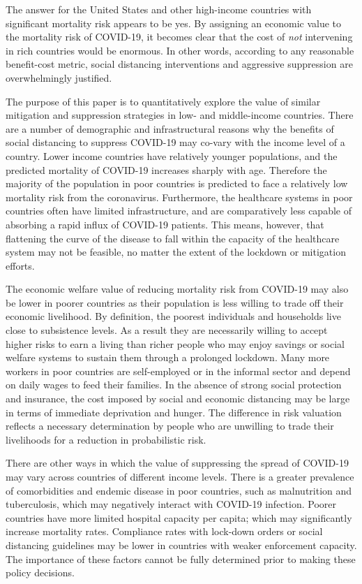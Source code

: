\documentclass[11pt]{article}
\begin{document}
The answer for the United States and other high-income countries with significant mortality risk appears to be yes. By assigning an economic value to the mortality risk of COVID-19, it becomes clear that the cost of \textit{not} intervening in rich countries would be enormous. In other words, according to any reasonable benefit-cost metric, social distancing interventions and aggressive suppression are overwhelmingly justified.

The purpose of this paper is to quantitatively explore the value of similar mitigation and suppression strategies in low- and middle-income countries. There are a number of demographic and infrastructural reasons why the benefits of social distancing to suppress COVID-19 may co-vary with the income level of a country. Lower income countries have relatively younger populations, and the predicted mortality of COVID-19 increases sharply with age. Therefore the majority of the population in poor countries is predicted to face a relatively low mortality risk from the coronavirus. Furthermore, the healthcare systems in poor countries often have limited infrastructure, and are comparatively less capable of absorbing a rapid influx of COVID-19 patients. This means, however, that flattening the curve of the disease to fall within the capacity of the healthcare system may not be feasible, no matter the extent of the lockdown or mitigation efforts. 

The economic welfare value of reducing mortality risk from COVID-19 may also be lower in poorer countries as their population is less willing to trade off their economic livelihood. By definition, the poorest individuals and households live close to subsistence levels. As a result they are necessarily willing to accept higher risks to earn a living than richer people who may enjoy savings or social welfare systems to sustain them through a prolonged lockdown. Many more workers in poor countries are self-employed or in the informal sector and depend on daily wages to feed their families. In the absence of strong social protection and insurance, the cost imposed by social and economic distancing may be large in terms of immediate deprivation and hunger. The difference in risk valuation reflects a necessary determination by people who are unwilling to trade their livelihoods for a reduction in probabilistic risk.

There are other ways in which the value of suppressing the spread of COVID-19 may vary across countries of different income levels. There is a greater prevalence of comorbidities and endemic disease in poor countries, such as malnutrition and tuberculosis, which may negatively interact with COVID-19 infection. Poorer countries have more limited hospital capacity per capita; which may significantly increase mortality rates. Compliance rates with lock-down orders or social distancing guidelines may be lower in countries with weaker enforcement capacity. The importance of these factors cannot be fully determined prior to making these policy decisions. 
\end{document}

